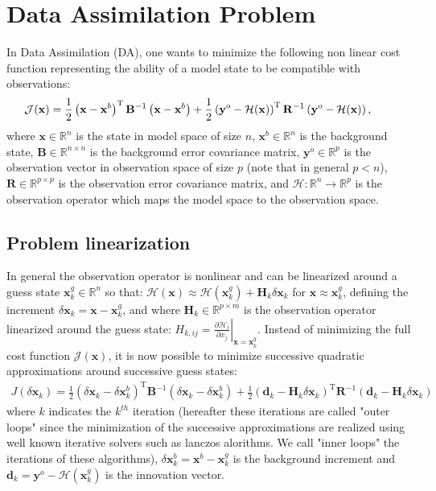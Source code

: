 \documentclass[npg, manuscript]{copernicus}
\begin{document}
\section{Data Assimilation Problem}
In Data Assimilation (DA), one wants to minimize the following non linear cost function representing the ability of a model state to be compatible with observations:
\begin{align}
\hspace{-0.7cm} \mathcal{J}(\mathbf{x}) = \frac{1}{2} \left(\mathbf{x}-\mathbf{x}^b\right)^\mathrm{T} \mathbf{B}^{-1} \left(\mathbf{x}-\mathbf{x}^b\right) + \frac{1}{2} \left(\mathbf{y}^o-\mathcal{H}(\mathbf{x})\right)^\mathrm{T} \mathbf{R}^{-1} \left(\mathbf{y}^o-\mathcal{H}(\mathbf{x})\right),
\end{align}
where $\mathbf{x} \in \mathbb{R}^n$ is the state in model space of size $n$, $\mathbf{x}^b \in \mathbb{R}^n$ is the background state, $\mathbf{B} \in \mathbb{R}^{n \times n}$ is the background error covariance matrix, $\mathbf{y}^o \in \mathbb{R}^p$ is the observation vector  in observation space of size $p$ (note that in general $p<n$), $\mathbf{R} \in \mathbb{R}^{p \times p}$ is the observation error covariance matrix, and $\mathcal{H} : \mathbb{R}^n \rightarrow \mathbb{R}^p$ is the observation operator which maps the model space to the observation space. 

\subsection{Problem linearization}
In general the observation operator is nonlinear and can be linearized around a guess state $\mathbf{x}^g_k \in \mathbb{R}^n$ so that: $\mathcal{H}(\mathbf{x}) \approx \mathcal{H}(\mathbf{x}^g_k) + \mathbf{H}_k \delta \mathbf{x}_k$ for $\mathbf{x} \approx \mathbf{x}^g_k$, defining the increment $\delta \mathbf{x}_k =  \mathbf{x}-\mathbf{x}^g_k$, and where $\mathbf{H}_k \in \mathbb{R}^{p \times m}$ is the observation operator linearized around the guess state: $H_{k,ij} = \left.\frac{\partial \mathcal{H}_i}{\partial x_j}\right|_{\mathbf{x} = \mathbf{x}^g_k}$. Instead of minimizing the full cost function $\mathcal{J}(\mathbf{x})$, it is now possible to minimize successive quadratic approximations around successive guess states:
\begin{align}
\label{eq:cost_quad}
J \left(\delta \mathbf{x}_k\right) = \frac{1}{2} \left(\delta \mathbf{x}_k-\delta \mathbf{x}^b_k\right)^\mathrm{T} \mathbf{B}^{-1} \left(\delta \mathbf{x}_k-\delta \mathbf{x}^b_k\right) + \frac{1}{2} \left(\mathbf{d}_k - \mathbf{H}_k \delta \mathbf{x}_k\right)^\mathrm{T} \mathbf{R}^{-1} \left(\mathbf{d}_k - \mathbf{H}_k \delta \mathbf{x}_k\right)
\end{align}
where $k$ indicates the $k^{th}$ iteration (hereafter these iterations are called "outer loops" since the minimization of the successive approximations are realized using well known iterative solvers such as lanczos alorithms. We call "inner loops" the iterations of these algorithms), $\delta \mathbf{x}^b_k = \mathbf{x}^b - \mathbf{x}^g_k$ is the background increment and $\mathbf{d}_k = \mathbf{y}^o - \mathcal{H}(\mathbf{x}^g_k)$ is the innovation vector.\\
\end{document}
